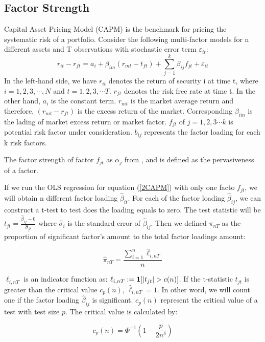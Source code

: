 \documentclass[12pt]{article}
\begin{document}
			\subsection{Factor Strength}\label{strength}
Capital Asset Pricing Model (CAPM) is the benchmark for pricing the systematic risk of a portfolio. 
Consider the following multi-factor models for n different assets and T observations with stochastic error term $\varepsilon_{it}$:
\[   r_{it} - r_{ft} = a_i + \beta_{im}(r_{mt} - t_{ft}) + \sum_{j=1}^{k}\beta_{ij}f_{jt} + \varepsilon_{it} \tag{1}\label{2CAPM} \]
In the left-hand side, we have $r_{it}$ denotes the return of  security i at time t, where $i = 1, 2,3, \cdots, N$ and $t = 1,2,3, \cdots T$.  
$r_{ft}$ denotes the risk free rate at time t.
In the other hand, $a_i$ is the constant term. 
$r_{mt}$ is the market average return and therefore, $(r_{mt} - r_{ft}) $ is the excess return of the market. 
Corresponding $\beta_{im}$ is the lading of market excess return or market factor.
$f_{jt}$ of $j = 1, 2, 3\cdots k$ is potential risk factor under consideration.
$b_{ij}$ represents the factor loading for each k risk factors.

The factor strength of factor $f_{jt}$ as $\alpha_j$ from , and  is defined as the pervasiveness of a factor.

If we run the OLS regression for equation (\ref{2CAPM}) with only one facto  $f_{jt}$, we will obtain n different factor loading $\hat{\beta}_{it}$. For each of the  factor loading $\hat{\beta}_{ij}$, we can construct a t-test to test does the loading equals to zero. The test statistic will be $t_{jt} = \frac{\hat{\beta}_{ij} - 0}{\hat{\sigma}_{jt}}$ where $\hat{\sigma}_{i}$ is the standard error of $\hat{\beta}_{ij}$.  
Then we defined $\pi_{nT}$ as the proportion of significant factor's amount to the total factor loadings amount:

\[  \hat{\pi}_{nT} = \frac{\sum_{i=1}^n \hat{\ell}_{i,nT}}{n} \tag{2} \label{pi_function} \]

$\ell_{i,nT}$ is an indicator function as: $\ell_{i,nT} := {\bf1}[|t_{jt}|>c(n)]$. 
If the t-statistic $t_{jt}$ is greater than the critical value $c_p(n)$,  $\hat{\ell}_{i,nT} = 1$. 
In other word, we will count one if the factor loading $\hat{\beta}_{ij}$ is significant. 
$c_p(n)$ represent the critical value of a test with test size $p$. 
The critical value is calculated by:

\[   c_p(n) = \Phi^{-1}(1 - \frac{p}{2n^\delta})   \tag{3} \label{critical_value_function} \]
\end{document}
